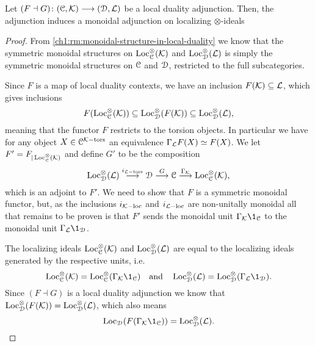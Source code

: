 \begin{lemma}
    \label{ch1:lm:induced-torsion-adjunction}
    Let $(F\dashv G)\colon (\EuScript{C}, \mathcal{K})\longrightarrow (\EuScript{D}, \mathcal{L})$ be a local duality adjunction. Then, the adjunction induces a monoidal adjunction on localizing $\otimes$-ideals
    \begin{center}
    \end{center}
\end{lemma}
\begin{proof}
    From \cref{ch1:rm:monoidal-structure-in-local-duality} we know that the symmetric monoidal structures on $\operatorname{Loc}^\otimes_{\EuScript{C}}(\mathcal{K})$ and $\operatorname{Loc}^\otimes_{\EuScript{D}}(\mathcal{L})$ is simply the symmetric monoidal structures on $\EuScript{C}$ and $\EuScript{D}$, restricted to the full subcategories. 
    
    Since $F$ is a map of local duality contexts, we have an inclusion $F(\mathcal{K})\subseteq \mathcal{L}$, which gives inclusions  
    \[F(\operatorname{Loc}^\otimes_{\EuScript{C}}(\mathcal{K}))\subseteq \operatorname{Loc}^\otimes_{\EuScript{D}}(F(\mathcal{K}))\subseteq \operatorname{Loc}^\otimes_{\EuScript{D}}(\mathcal{L}),\]
    meaning that the functor $F$ restricts to the torsion objects. In particular we have for any object $X\in \EuScript{C}^{\mathcal{K}-\mathrm{tors}}$ an equivalence $\Gamma_{\mathcal{L}} F(X) \simeq F(X)$. We let $F'=F_{|\operatorname{Loc}^\otimes_{\EuScript{C}}(\mathcal{K})}$ and define $G'$ to be the composition 
    \[\operatorname{Loc}^{\otimes}_{\EuScript{D}}(\mathcal{L})\overset{i_{\mathcal{L}-\mathrm{tors}}}\longrightarrow \EuScript{D}\overset{G}\longrightarrow \EuScript{C}\overset{\Gamma_{\mathcal{K}}}\longrightarrow \operatorname{Loc}_{\EuScript{C}}^{\otimes}(\mathcal{K}),\]
    which is an adjoint to $F'$. We need to show that $F$ is a symmetric monoidal functor, but, as the inclusions $i_{\mathcal{K}-\mathrm{loc}}$ and $i_{\mathcal{L}-\mathrm{loc}}$ are non-unitally monoidal all that remains to be proven is that $F'$ sends the monoidal unit $\Gamma_\K \1_\C$ to the monoidal unit $\Gamma_\L \1_\D$. 

    The localizing ideals $\operatorname{Loc}_{\EuScript{C}}^\otimes(\mathcal{K})$ and $\operatorname{Loc}_{\EuScript{D}}^\otimes(\mathcal{L})$ are equal to the localizing ideals generated by the respective units, i.e. 
    \[\Loc_\C^\otimes(\K) = \Loc_\C^\otimes(\Gamma_\K\1_\C) \quad \text{and}\quad \Loc_\D^\otimes(\L) = \Loc_\D^\otimes(\Gamma_\L\1_\D).\]
    Since $(F\dashv G)$ is a local duality adjunction we know that $\operatorname{Loc}^\otimes_{\EuScript{D}}(F(\mathcal{K}))= \operatorname{Loc}_{\EuScript{D}}^\otimes(\mathcal{L})$, which also means 
    \[\Loc_\D(F(\Gamma_\K \1_\C)) = \Loc_\D^\otimes(\L).\]


\end{proof}
